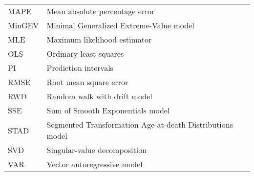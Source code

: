 \documentclass[Thesis]{subfiles}
\begin{document}
\begin{table}[h]
\begin{tabular}{p{2cm}l}
		MAPE & Mean absolute percentage error\\
		MinGEV & Minimal Generalized Extreme-Value model\\
		MLE & Maximum likelihood estimator\\
		OLS & Ordinary least-squares\\
		PI & Prediction intervals\\
		RMSE & Root mean square error\\
		RWD & Random walk with drift model\\
		SSE & Sum of Smooth Exponentials model\\
		STAD & Segmented Transformation Age-at-death Distributions model\\
		SVD & Singular-value decomposition\\
		VAR & Vector autoregressive model\\
	\end{tabular}
\end{table}
\cleardoublepage
\end{document}
